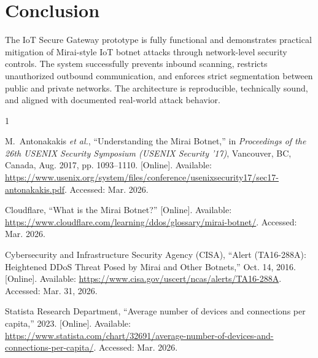 \documentclass[journal]{IEEEtran}
\begin{document}
\section{Conclusion}
The IoT Secure Gateway prototype is fully functional and demonstrates practical mitigation of Mirai-style IoT botnet attacks through network-level security controls. The system successfully prevents inbound scanning, restricts unauthorized outbound communication, and enforces strict segmentation between public and private networks. The architecture is reproducible, technically sound, and aligned with documented real-world attack behavior.

\begin{thebibliography}{1}

M.~Antonakakis \emph{et al.}, ``Understanding the Mirai Botnet,'' in \emph{Proceedings of the 26th USENIX Security Symposium (USENIX Security '17)}, Vancouver, BC, Canada, Aug. 2017, pp. 1093--1110. [Online]. Available: \url{https://www.usenix.org/system/files/conference/usenixsecurity17/sec17-antonakakis.pdf}. Accessed: Mar. 2026.

Cloudflare, ``What is the Mirai Botnet?'' [Online]. Available: \url{https://www.cloudflare.com/learning/ddos/glossary/mirai-botnet/}. Accessed: Mar. 2026.

Cybersecurity and Infrastructure Security Agency (CISA), ``Alert (TA16-288A): Heightened DDoS Threat Posed by Mirai and Other Botnets,'' Oct. 14, 2016. [Online]. Available: \url{https://www.cisa.gov/uscert/ncas/alerts/TA16-288A}. Accessed: Mar. 31, 2026.

Statista Research Department, ``Average number of devices and connections per capita,'' 2023. [Online]. Available: \url{https://www.statista.com/chart/32691/average-number-of-devices-and-connections-per-capita/}. Accessed: Mar. 2026.

\end{thebibliography}
\end{document}
